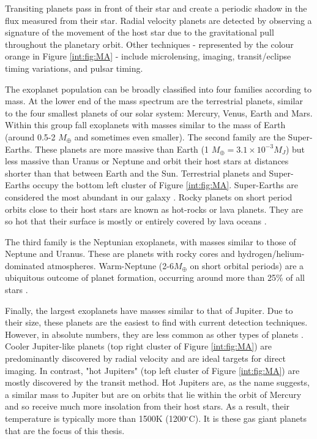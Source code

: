 Transiting planets pass in front of their star and create a periodic shadow in the flux measured from their star. Radial velocity planets are detected by observing a signature of the movement of the host star due to the gravitational pull throughout the planetary orbit. Other techniques - represented by the colour orange in Figure \ref{int:fig:MA} - include microlensing, imaging, transit/eclipse timing variations, and pulsar timing.

The exoplanet population can be broadly classified into four families according to mass. At the lower end of the mass spectrum are the terrestrial planets, similar to the four smallest planets of our solar system: Mercury, Venus, Earth and Mars. Within this group fall  exoplanets with masses similar to the mass of Earth (around 0.5-2 $M_\oplus$ and sometimes even smaller). The second family are the Super-Earths. These planets are more massive than Earth (1 $M_\oplus = 3.1\times10^{-3} M_J$) but less massive than Uranus or Neptune and orbit their host stars at distances shorter than that between Earth and the Sun. Terrestrial planets and Super-Earths occupy the bottom left cluster of Figure \ref{int:fig:MA}. Super-Earths are considered the most abundant in our galaxy \citep{Borucki2011,Howard2012,Morton2014,Batalha2014,Petigura2013,Petigura2018,Fulton2017,Bryson2020}. Rocky planets on short period orbits close to their host stars are known as hot-rocks or lava planets. They are so hot that their surface is mostly or entirely covered by lava oceans \citep[e.g.,][]{Leger2011, Elkins-Tanton2012, Winn2018}.

The third family is the Neptunian exoplanets, with masses similar to those of Neptune and Uranus. These are planets with rocky cores and  hydrogen/helium-dominated atmospheres. Warm-Neptune (2-6$M_\oplus$ on short orbital periods) are a ubiquitous outcome of planet formation, occurring around more than 25\% of all stars \citep[e.g.,][]{Buchhave2014, Fulton2017}.

Finally, the largest exoplanets have masses similar to that of Jupiter. Due to their size, these planets are the easiest to find with current detection techniques. However, in absolute numbers, they are less common as other types of planets \citep[e.g.,][]{Gould2006,Howard2012,Fressin2013,Santerne2012,Wright2012}. Cooler Jupiter-like planets (top right cluster of Figure \ref{int:fig:MA}) are predominantly discovered by radial velocity and are ideal targets for direct imaging. In contrast,  "hot Jupiters" (top left cluster of Figure \ref{int:fig:MA}) are mostly discovered by the transit method. Hot Jupiters are, as the name suggests, a similar mass to Jupiter but are on orbits that lie within the orbit of Mercury and so receive much more insolation from their host stars. As a result, their temperature is typically more than 1500K (1200$^\circ$C).  It is these gas giant planets that are the focus of this thesis.

